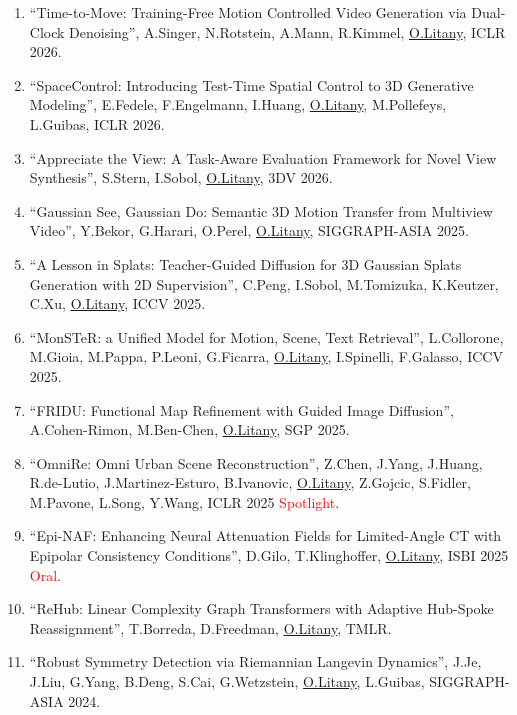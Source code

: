 \begin{enumerate}
\item ``Time-to-Move: Training-Free Motion Controlled Video Generation via Dual-Clock Denoising'', A.Singer, N.Rotstein, A.Mann, R.Kimmel, \underline{O.Litany}, ICLR 2026.

\item ``SpaceControl: Introducing Test-Time Spatial Control to 3D Generative Modeling'', E.Fedele, F.Engelmann, I.Huang, \underline{O.Litany}, M.Pollefeys, L.Guibas, ICLR 2026.

\item ``Appreciate the View: A Task-Aware Evaluation Framework for Novel View Synthesis'', S.Stern, I.Sobol, \underline{O.Litany}, 3DV 2026.

\item ``Gaussian See, Gaussian Do: Semantic 3D Motion Transfer from Multiview Video'', Y.Bekor, G.Harari, O.Perel, \underline{O.Litany}, SIGGRAPH-ASIA 2025.

\item ``A Lesson in Splats: Teacher-Guided Diffusion for 3D Gaussian Splats Generation with 2D Supervision'', C.Peng, I.Sobol, M.Tomizuka, K.Keutzer, C.Xu, \underline{O.Litany}, ICCV 2025.

\item ``MonSTeR: a Unified Model for Motion, Scene, Text Retrieval'', L.Collorone, M.Gioia, M.Pappa, P.Leoni, G.Ficarra, \underline{O.Litany}, I.Spinelli, F.Galasso, ICCV 2025.

\item ``FRIDU: Functional Map Refinement with Guided Image Diffusion'', A.{Cohen-Rimon}, M.Ben-Chen, \underline{O.Litany}, SGP 2025.

\item ``OmniRe: Omni Urban Scene Reconstruction'', Z.Chen, J.Yang, J.Huang, R.de-Lutio, J.{Martinez-Esturo}, B.Ivanovic, \underline{O.Litany}, Z.Gojcic, S.Fidler, M.Pavone, L.Song, Y.Wang, ICLR 2025 \textcolor{red}{Spotlight}.

\item ``Epi-NAF: Enhancing Neural Attenuation Fields for Limited-Angle CT with Epipolar Consistency Conditions'', D.Gilo, T.Klinghoffer, \underline{O.Litany}, ISBI 2025 \textcolor{red}{Oral}.

\item ``ReHub: Linear Complexity Graph Transformers with Adaptive Hub-Spoke Reassignment'', T.Borreda, D.Freedman, \underline{O.Litany}, TMLR.

\item ``Robust Symmetry Detection via Riemannian Langevin Dynamics'', J.Je, J.Liu, G.Yang, B.Deng, S.Cai, G.Wetzstein, \underline{O.Litany}, L.Guibas, SIGGRAPH-ASIA 2024.


\end{enumerate}
